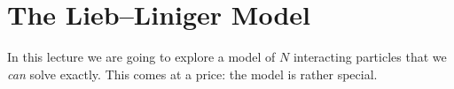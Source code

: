 \section{The Lieb--Liniger Model}

In this lecture we are going to explore a model of $N$ interacting particles that we \emph{can} solve exactly. This comes at a price: the model is rather special.